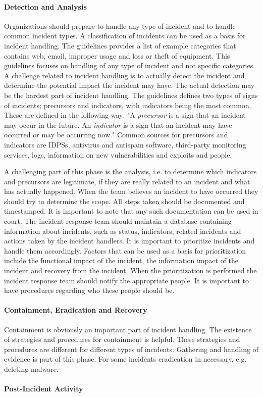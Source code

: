 \paragraph{Detection and Analysis}
Organizations should prepare to handle any type of incident and to handle common incident types. A classification of incidents can be used as a basis for incident handling. The guidelines provides a list of example categories that contains web, email, improper usage and loss or theft of equipment. This guidelines focuses on handling of any type of incident and not specific categories. A challenge related to incident handling is to actually detect the incident and determine the potential impact the incident may have. The actual detection may be the hardest part of incident handling. The guidelines defines two types of signs of incidents; precursors and indicators, with indicators being the most common. These are defined in the following way: "A \emph{precursor} is a sign that an incident may occur in the future. An \emph{indicator} is a sign that an incident may have occurred or may be occurring now." Common sources for precursors and indicators are \acp{IDPS}, antivirus and antispam software, third-party monitoring services, logs, information on new vulnerabilities and exploits and people. 

A challenging part of this phase is the analysis, i.e. to determine which indicators and precursors are legitimate, if they are really related to an incident and what has actually happened. When the team believes an incident to have occurred they should try to determine the scope. All steps taken should be documented and timestamped. It is important to note that any such documentation can be used in court. The incident response team should maintain a database containing information about incidents, such as status, indicators, related incidents and actions taken by the incident handlers. It is important to prioritize incidents and handle them accordingly. Factors that can be used as a basis for prioritization include the functional impact of the incident, the information impact of the incident and recovery from the incident. When the prioritization is performed the incident response team should notify the appropriate people. It is important to have procedures regarding who these people should be.

\paragraph{Containment, Eradication and Recovery}
Containment is obviously an important part of incident handling. The existence of strategies and procedures for containment is helpful. These strategies and procedures are different for different types of incidents. Gathering and handling of evidence is part of this phase. For some incidents eradication in necessary, e.g. deleting malware.

\paragraph{Post-Incident Activity}


